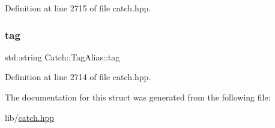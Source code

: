 Definition at line 2715 of file catch.\+hpp.

\hypertarget{struct_catch_1_1_tag_alias_a950183883ab17c90d0fab16b966b6e2d}{}\label{struct_catch_1_1_tag_alias_a950183883ab17c90d0fab16b966b6e2d} 
\subsubsection{\texorpdfstring{tag}{tag}}
{\footnotesize\ttfamily std\+::string Catch\+::\+Tag\+Alias\+::tag}



Definition at line 2714 of file catch.\+hpp.



The documentation for this struct was generated from the following file\+:\begin{DoxyCompactItemize}
\item 
lib/\hyperlink{catch_8hpp}{catch.\+hpp}\end{DoxyCompactItemize}
